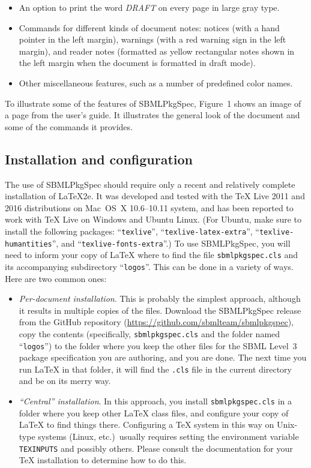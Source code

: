 \documentclass{bmcart}
\newcommand{\sbmlpkg}{SBMLPkgSpec}
\newcommand{\sbmlpkgfile}{\texttt{sbmlpkgspec.cls}}
\newcommand{\githuburl}{https://github.com/sbmlteam/sbmlpkgspec}
\begin{document}
\begin{itemize}
\item An option to print the word \emph{DRAFT} on every page in large gray type.

\item Commands for different kinds of document notes: notices (with a hand pointer in the left margin), warnings (with a red warning sign in the left margin), and reader notes (formatted as yellow rectangular notes shown in the left margin when the document is formatted in draft mode).

\item Other miscellaneous features, such as a number of predefined color names.

\end{itemize}

To illustrate some of the features of \sbmlpkg{}, Figure~1 shows an image of a page from the user's guide.  It illustrates the general look of the document and some of the commands it provides.


\subsection*{Installation and configuration}

The use of \sbmlpkg{} should require only a recent and relatively complete installation of LaTeX2e.  It was developed and tested with the TeX Live 2011 and 2016 distributions on Mac~OS~X 10.6--10.11 system, and has been reported to work with TeX Live on Windows and Ubuntu Linux.  (For Ubuntu, make sure to install the following packages: ``\texttt{texlive}'', ``\texttt{texlive-latex-extra}'', ``\texttt{texlive-humantities}'', and ``\texttt{texlive-fonts-extra}''.)  To use \sbmlpkg, you will need to inform your copy of LaTeX where to find the file \sbmlpkgfile{} and its accompanying subdirectory ``\texttt{logos}''.  This can be done in a variety of ways.  Here are two common ones:

\begin{itemize}

\item \emph{Per-document installation}.  This is probably the simplest approach, although it results in multiple copies of the files.  Download the \sbmlpkg{} release from the GitHub repository (\url{\githuburl}), copy the contents (specifically, \sbmlpkgfile{} and the folder named ``\texttt{logos}'') to the folder where you keep the other files for the SBML Level~3 package specification you are authoring, and you are done.  The next time you run LaTeX in that folder, it will find the \texttt{.cls} file in the current directory and be on its merry way.

\item \emph{``Central'' installation}.  In this approach, you install \sbmlpkgfile{} in a folder where you keep other LaTeX class files, and configure your copy of LaTeX to find things there.  Configuring a TeX system in this way on Unix-type systems (Linux, etc.)\ usually requires setting the environment variable \texttt{TEXINPUTS} and possibly others.  Please consult the documentation for your TeX installation to determine how to do this.

\end{itemize}
\end{document}
